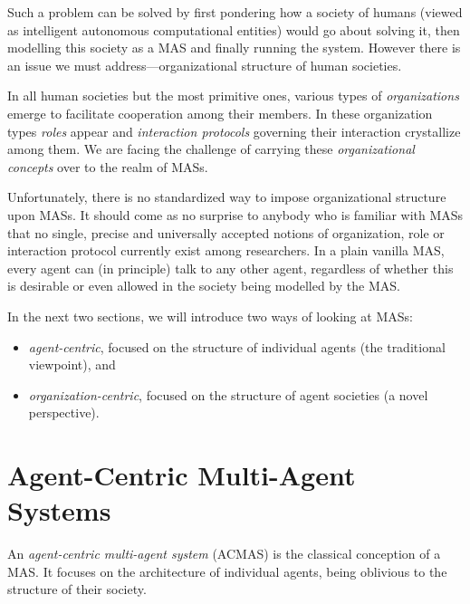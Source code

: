 Such a problem can be solved by first pondering how a society of humans (viewed as intelligent autonomous computational entities) would go about solving it, then modelling this society as a MAS and finally running the system.
However there is an issue we must address---organizational structure of human societies.

In all human societies but the most primitive ones, various types of \textit{organizations} emerge to facilitate cooperation among their members.
In these organization types \textit{roles} appear and \textit{interaction protocols} governing their interaction crystallize among them.
We are facing the challenge of carrying these \textit{organizational concepts} over to the realm of MASs.

Unfortunately, there is no standardized way to impose organizational structure upon MASs.
It should come as no surprise to anybody who is familiar with MASs that no single, precise and universally accepted notions of organization, role or interaction protocol currently exist among researchers.
In a plain vanilla MAS, every agent can (in principle) talk to any other agent, regardless of whether this is desirable or even allowed in the society being modelled by the MAS.

In the next two sections, we will introduce two ways of looking at MASs:
\begin{itemize}
	\item \textit{agent-centric}, focused on the structure of individual agents (the traditional viewpoint), and
	\item \textit{organization-centric}, focused on the structure of agent societies (a novel perspective).
\end{itemize}

\section{Agent-Centric Multi-Agent Systems}

An \textit{agent-centric multi-agent system} (ACMAS) is the classical conception of a MAS.
It focuses on the architecture of individual agents, being oblivious to the structure of their society.

